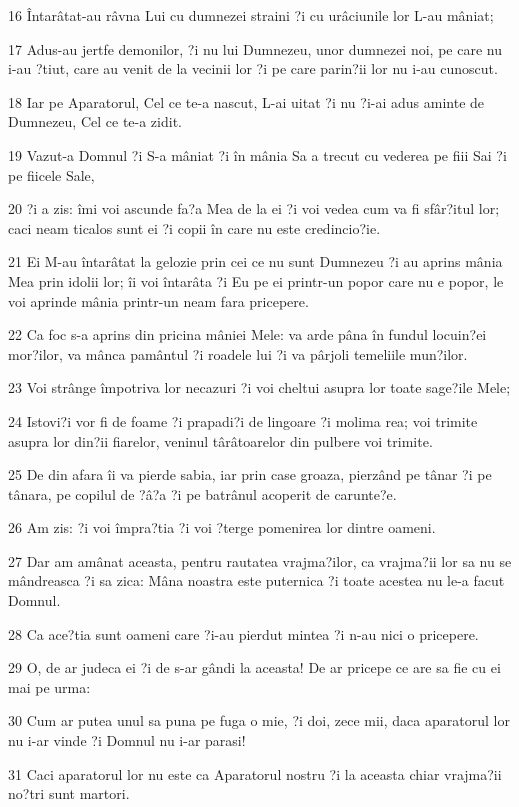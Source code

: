 \par 16 Întarâtat-au râvna Lui cu dumnezei straini ?i cu urâciunile lor L-au mâniat;
\par 17 Adus-au jertfe demonilor, ?i nu lui Dumnezeu, unor dumnezei noi, pe care nu i-au ?tiut, care au venit de la vecinii lor ?i pe care parin?ii lor nu i-au cunoscut.
\par 18 Iar pe Aparatorul, Cel ce te-a nascut, L-ai uitat ?i nu ?i-ai adus aminte de Dumnezeu, Cel ce te-a zidit.
\par 19 Vazut-a Domnul ?i S-a mâniat ?i în mânia Sa a trecut cu vederea pe fiii Sai ?i pe fiicele Sale,
\par 20 ?i a zis: îmi voi ascunde fa?a Mea de la ei ?i voi vedea cum va fi sfâr?itul lor; caci neam ticalos sunt ei ?i copii în care nu este credincio?ie.
\par 21 Ei M-au întarâtat la gelozie prin cei ce nu sunt Dumnezeu ?i au aprins mânia Mea prin idolii lor; îi voi întarâta ?i Eu pe ei printr-un popor care nu e popor, le voi aprinde mânia printr-un neam fara pricepere.
\par 22 Ca foc s-a aprins din pricina mâniei Mele: va arde pâna în fundul locuin?ei mor?ilor, va mânca pamântul ?i roadele lui ?i va pârjoli temeliile mun?ilor.
\par 23 Voi strânge împotriva lor necazuri ?i voi cheltui asupra lor toate sage?ile Mele;
\par 24 Istovi?i vor fi de foame ?i prapadi?i de lingoare ?i molima rea; voi trimite asupra lor din?ii fiarelor, veninul târâtoarelor din pulbere voi trimite.
\par 25 De din afara îi va pierde sabia, iar prin case groaza, pierzând pe tânar ?i pe tânara, pe copilul de ?â?a ?i pe batrânul acoperit de carunte?e.
\par 26 Am zis: ?i voi împra?tia ?i voi ?terge pomenirea lor dintre oameni.
\par 27 Dar am amânat aceasta, pentru rautatea vrajma?ilor, ca vrajma?ii lor sa nu se mândreasca ?i sa zica: Mâna noastra este puternica ?i toate acestea nu le-a facut Domnul.
\par 28 Ca ace?tia sunt oameni care ?i-au pierdut mintea ?i n-au nici o pricepere.
\par 29 O, de ar judeca ei ?i de s-ar gândi la aceasta! De ar pricepe ce are sa fie cu ei mai pe urma:
\par 30 Cum ar putea unul sa puna pe fuga o mie, ?i doi, zece mii, daca aparatorul lor nu i-ar vinde ?i Domnul nu i-ar parasi!
\par 31 Caci aparatorul lor nu este ca Aparatorul nostru ?i la aceasta chiar vrajma?ii no?tri sunt martori.
